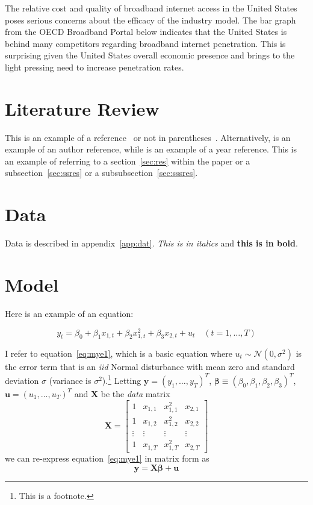 \documentclass[a4paper,oneside]{article}
\begin{document}
The relative cost and quality of broadband internet access in the United States poses
serious concerns about the efficacy of the industry model. The bar graph from the OECD
Broadband Portal below indicates that the United States is behind many competitors regarding
broadband internet penetration. This is surprising given the United States overall economic
presence and brings to the light pressing need to increase penetration rates.

\section{Literature Review}

This is an example of a reference~\citep{engle_autoregressive_1982} or not in parentheses~\citet{engle_autoregressive_1982}. Alternatively, \citeauthor{lucas_jr_econometric_1976} is an example of an author reference, while \citeyear{lane_european_2012} is an example of a year reference. This is an example of referring to a section~\ref{sec:res} within the paper or a subsection~\ref{sec:ssres} or a subsubsection~\ref{sec:sssres}.

\section{Data}

Data is described in appendix~\ref{app:dat}. \textit{This is in italics} and \textbf{this is in bold}.

\section{Model}

Here is an example of an equation:

\begin{equation}
y_t = \beta_0 + \beta_1x_{1,t} + \beta_2x_{1,t}^2 + \beta_3x_{2,t} + u_t	\quad (t=1,\ldots,T)
\label{eq:mye1}
\end{equation}

I refer to equation~\eqref{eq:mye1}, which is a basic equation where $u_t \sim \mathcal{N}(0,\sigma^2)$ is the error term that is an \textit{iid} Normal disturbance with mean zero and standard deviation $\sigma$ (variance is $\sigma^2$).\footnote{This is a footnote.} Letting $\bm{y}=(y_1,\ldots,y_T)^T$, $\boldsymbol{\beta}\equiv(\beta_0,\beta_1,\beta_2,\beta_3)^T$, $\bm{u}=(u_1,\ldots,u_T)^T$ and $\bm{X}$ be the \textit{data} matrix
\begin{equation*} %
\bm{X} = 
\begin{bmatrix}
1				&	x_{1,1}	&	x_{1,1}^2	& x_{2,1}	\\
1				&	x_{1,2}	&	x_{1,2}^2	& x_{2,2}	\\
\vdots	&	\vdots	&	\vdots		&	\vdots	\\
1				&	x_{1,T}	&	x_{1,T}^2	&	x_{2,T}
\end{bmatrix}
\end{equation*}
we can re-express equation~\eqref{eq:mye1} in matrix form as
\begin{equation*}
\bm{y} = \bm{X}\bm{\beta} + \bm{u}
\end{equation*}
\end{document}
